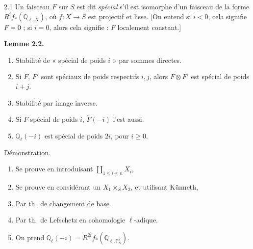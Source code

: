 \documentclass[11pt,a4paper]{article}
\begin{document}
2.1 Un faisceau $F$ sur $S$ est dit \emph{spécial}  s'il
est isomorphe  
 d'un faisceau de la forme $R^{i}f_{*}(\mathbb{Q}_{\ell,X})$,
où $f : X \to S$ est projectif et lisse. [On entend  si $i < 0$,
cela signifie $F = 0$ ; si $i = 0$, alors \struck{\ill{}} cela signifie :
$F$ localement constant.]

\textbf{Lemme 2.2.}
\begin{enumerate}
\item[a)] Stabilité de « spécial de poids $i$ » par sommes directes.
\item[b)] Si $F$, $F'$ sont spéciaux de poids respectifs $i, j$, alors
$F \otimes F'$ est spécial de poids $i+j$.
\item[c)] Stabilité par image inverse.
\item[d)] Si $F$ spécial de poids $i$, $\check{F}(-i)$ l'est aussi.
\item[e)] $\mathbb{Q}_{\ell}(-i)$ est spécial de poids $2i$, pour $i \geqslant 0$.
\end{enumerate}

Démonstration.
\begin{enumerate}
\item[a)] Se prouve en introduisant $\coprod_{1 \leqslant i \leqslant n} X_{i}$,
\item[b)] Se prouve en considérant un $X_{1} \times_{S} X_{2}$, et utilisant
Künneth,
\item[c)] Par th.\ de changement de base.
\item[d)] Par th.\ de Lefschetz en cohomologie $\ell$-adique.
\item[e)] On prend $\mathbb{Q}_{\ell}(-i) = R^{2i}f_{*}(\mathbb{Q}_{\ell,
\mathbb{P}^{i}_{S}})$.
\end{enumerate}
\end{document}
